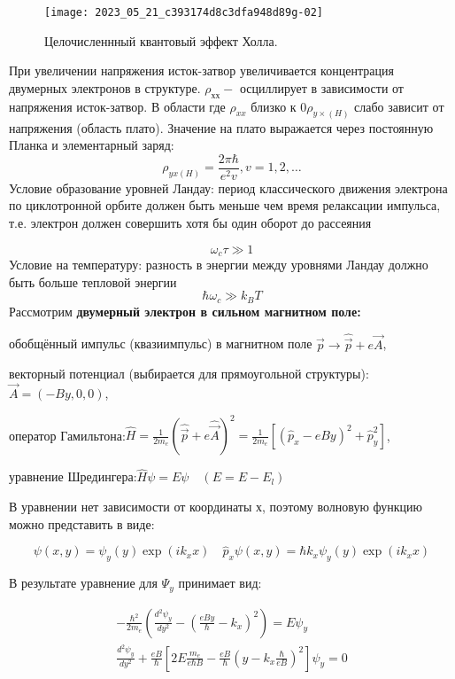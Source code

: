 \begin{figure}[h!]
    \centering
    \texttt{[image: 2023\_05\_21\_c393174d8c3dfa948d89g-02]}
    \caption*{Целочисленнный квантовый эффект Холла.}
\end{figure}
При увеличении
напряжения исток-затвор
увеличивается
концентрация двумерных
электронов в структуре.
$\rho_{хх}-$ осциллирует в зависимости от напряжения исток-затвор. В области где $\rho_{x x}$ близко к $0 \rho_{y \times(H)}$ слабо зависит от напряжения (область плато). 
Значение на плато выражается через постоянную Планка и элементарный
заряд: $$
\rho_{y x(H)}=\frac{2 \pi \hbar}{e^2 v}, v=1,2, \ldots
$$
Условие образование уровней Ландау: период классического движения электрона по циклотронной орбите должен быть меньше чем время релаксации импульса, т.е. электрон должен совершить хотя бы один оборот до рассеяния

$$
\omega_{c} \tau \gg 1
$$
Условие на температуру: разность в энергии между уровнями Ландау должно быть больше тепловой энергии
$$
\hbar \omega_{c} \gg k_{B} T
$$
Рассмотрим \textbf{двумерный электрон в сильном магнитном поле:}

обобщённый импульс (квазиимпульс) в магнитном поле
$
\hat{\vec{p}} \rightarrow \hat{\vec{p}}+e \vec{A}
$, 

векторный потенциал (выбирается для прямоугольной структуры): $\vec{A}=(-B y, 0,0)$, 

оператор Гамильтона:$
\hat{H}=\frac{1}{2 m_{e}}(\hat{\vec{p}}+e \hat{\vec{A}})^{2}=\frac{1}{2 m_{e}}\left[\left(\hat{p}_{x}-e B y\right)^{2}+\hat{p}_{y}^{2}\right]
$, 

уравнение Шредингера:$
\hat{H} \psi=E \psi \quad\left(E=E-E_{l}\right) $

В уравнении нет зависимости от координаты х, поэтому волновую функцию можно представить в виде:

$$
\psi(x, y)=\psi_{y}(y) \exp \left(i k_{x} x\right) \quad \hat{p}_{x} \psi(x, y)=\hbar k_{x} \psi_{y}(y) \exp \left(i k_{x} x\right)
$$

В результате уравнение для $\Psi_{y}$ принимает вид:

$$
\begin{gathered}
-\frac{\hbar^{2}}{2 m_{e}}\left(\frac{d^{2} \psi_{y}}{d y^{2}}-\left(\frac{e B y}{\hbar}-k_{x}\right)^{2}\right)=E \psi_{y} \\
\frac{d^{2} \psi_{y}}{d y^{2}}+\frac{e B}{\hbar}\left[2 E \frac{m_{e}}{e \hbar B}-\frac{e B}{\hbar}\left(y-k_{x} \frac{\hbar}{e B}\right)^{2}\right] \psi_{y}=0
\end{gathered}
$$

